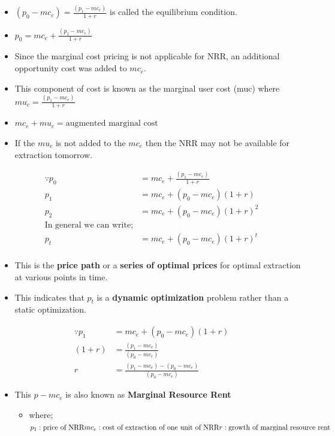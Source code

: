 \documentclass[
  ignorenonframetext,
]{beamer}
\providecommand{\tightlist}{%
  \setlength{\itemsep}{0pt}\setlength{\parskip}{0pt}}\usepackage{longtable,booktabs,array}
\begin{document}
\begin{frame}
\begin{itemize}
\tightlist
\item
  \((p_0 - mc_e) = \frac{(p_1 - mc_e)}{1 + r}\) is called the
  equilibrium condition.
\item
  \(p_0 = mc_e + \frac{(p_1 - mc_e)}{1 + r}\)
\item
  Since the marginal cost pricing is not applicable for NRR, an
  additional opportunity cost was added to \(mc_e\).
\item
  This component of cost is known as the marginal user cost (muc) where
  \(mu_c = \frac{(p_1 - mc_e)}{1 + r}\)
\item
  \(mc_e + mu_c = \text{augmented marginal cost}\)
\item
  If the \(mu_c\) is not added to the \(mc_e\) then the NRR may not be
  available for extraction tomorrow.
\end{itemize}
\end{frame}

\begin{frame}
\begin{align}
\because p_0 &= mc_e + \frac{(p_1 - mc_e)}{1 + r}\\
p_1 &= mc_e + (p_0 - mc_e)(1 + r) \\
p_2 &= mc_e + (p_0 - mc_e)(1 + r)^2\\
\text{In general we can write};\\
p_t &= mc_e + (p_0 - mc_e)(1 + r)^t\\
\end{align}

\begin{itemize}
\tightlist
\item
  This is the \textbf{price path} or a \textbf{series of optimal prices}
  for optimal extraction at various points in time.
\item
  This indicates that \(p_t\) is a \textbf{dynamic optimization} problem
  rather than a static optimization.
\end{itemize}
\end{frame}

\begin{frame}
\begin{align}
\because p_1 &= mc_e + (p_0 - mc_e)(1 + r) \\
(1+r) &= \frac{(p_1 - mc_e)}{(p_0 - mc_e)}  \\
r &= \frac{(p_1 - mc_e)-(p_0 - mc_e)}{(p_0 - mc_e)}
\end{align}

\begin{itemize}
\tightlist
\item
  This \(p - mc_e\) is also known as \textbf{Marginal Resource Rent}

  \begin{itemize}
  \tightlist
  \item
    where;
    \(p_1: \text{price of NRR}\\ mc_e: \text{cost of extraction of one unit of NRR}\\ r: \text{growth of marginal resource rent}\)
  \end{itemize}
\end{itemize}
\end{frame}
\end{document}
